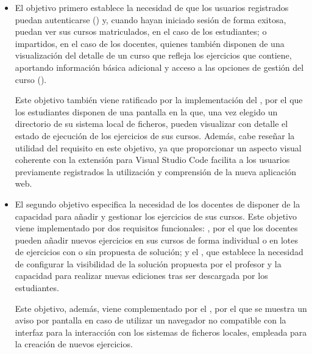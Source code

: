 \begin{itemize}
    \item El objetivo primero establece la necesidad de que los usuarios registrados puedan autenticarse () y, cuando hayan iniciado sesión de forma exitosa, puedan ver sus cursos matriculados, en el caso de los estudiantes; o impartidos, en el caso de los docentes, quienes también disponen de una visualización del detalle de un curso que refleja los ejercicios que contiene, aportando información básica adicional y acceso a las opciones de gestión del curso ().
    
    Este objetivo también viene ratificado por la implementación del , por el que los estudiantes disponen de una pantalla en la que, una vez elegido un directorio de su sistema local de ficheros, pueden visualizar con detalle el estado de ejecución de los ejercicios de sus cursos.
    Además, cabe reseñar la utilidad del requisito  en este objetivo, ya que proporcionar un aspecto visual coherente con la extensión para Visual Studio Code facilita a los usuarios previamente registrados la utilización y comprensión de la nueva aplicación web.
    \item El segundo objetivo especifica la necesidad de los docentes de disponer de la capacidad para añadir y gestionar los ejercicios de sus cursos. Este objetivo viene implementado por dos requisitos funcionales: , por el que los docentes pueden añadir nuevos ejercicios en sus cursos de forma individual o en lotes de ejercicios con o sin propuesta de solución; y el , que establece la necesidad de configurar la visibilidad de la solución propuesta por el profesor y la capacidad para realizar nuevas ediciones tras ser descargada por los estudiantes.

    Este objetivo, además, viene complementado por el , por el que se muestra un aviso por pantalla en caso de utilizar un navegador no compatible con la interfaz para la interacción con los sistemas de ficheros locales, empleada para la creación de nuevos ejercicios.


\end{itemize}
